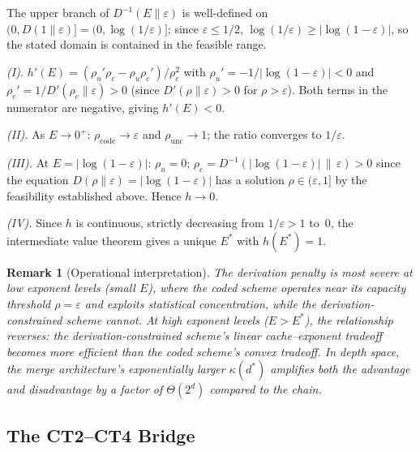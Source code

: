\documentclass[journal]{IEEEtran}
\makeatletter
\newtheorem{remark}{Remark}[section]
\numberwithin{equation}{section}
\renewenvironment{proof}[1][\proofname]{\par
  \pushQED{\qed}%
  \normalfont \topsep6\p@\@plus6\p@\relax
  \trivlist
  \item[\hskip\labelsep
        \itshape
    #1\@addpunct{.}]\ignorespaces
}{%
  \popQED\endtrivlist\@endpefalse
}
\makeatother
\begin{document}
\begin{proof}
The upper branch of $D^{-1}(E\|\varepsilon)$ is well-defined on
$(0,D(1\|\varepsilon)]=(0,\log(1/\varepsilon)]$; since
$\varepsilon\le 1/2$, $\log(1/\varepsilon)\ge|\!\log(1{-}\varepsilon)|$,
so the stated domain is contained in the feasible range.

\emph{(I).}\;
$h'(E)=(\rho_u'\rho_c-\rho_u\rho_c')/\rho_c^2$
with $\rho_u'=-1/|\!\log(1{-}\varepsilon)|<0$ and
$\rho_c'=1/D'(\rho_c\|\varepsilon)>0$
(since $D'(\rho\|\varepsilon)>0$ for $\rho>\varepsilon$).
Both terms in the numerator are negative, giving
$h'(E)<0$.

\emph{(II).}\;
As $E\to 0^+$:
$\rho_{\mathrm{code}}\to\varepsilon$ and
$\rho_{\mathrm{unc}}\to 1$; the ratio converges to
$1/\varepsilon$.

\emph{(III).}\;
At $E=|\!\log(1{-}\varepsilon)|$: $\rho_u=0$;
$\rho_c=D^{-1}(|\!\log(1{-}\varepsilon)|\,\|\,\varepsilon)>0$
since the equation $D(\rho\|\varepsilon)=|\!\log(1{-}\varepsilon)|$
has a solution $\rho\in(\varepsilon,1]$ by the
feasibility established above.
Hence $h\to 0$.

\emph{(IV).}\;
Since $h$ is continuous, strictly decreasing from
$1/\varepsilon>1$ to~$0$, the
intermediate value theorem gives a unique $E^*$
with $h(E^*)=1$.
\end{proof}

\begin{remark}[Operational interpretation]
\label{rem:exp-gap-ds}
The derivation penalty is most severe at low exponent
levels (small $E$), where the coded scheme operates
near its capacity threshold $\rho=\varepsilon$ and
exploits statistical concentration, while the
derivation-constrained scheme cannot.
At high exponent levels ($E>E^*$), the relationship
reverses: the derivation-constrained scheme's linear
cache--exponent tradeoff becomes more efficient than
the coded scheme's convex tradeoff.
In depth space, the merge architecture's exponentially
larger $\kappa(d^*)$ amplifies both the advantage and
disadvantage by a factor of $\Theta(2^d)$ compared to
the chain.
\end{remark}

\subsection{The CT2--CT4 Bridge}
\label{subsec:ct2-ct4}
\end{document}
